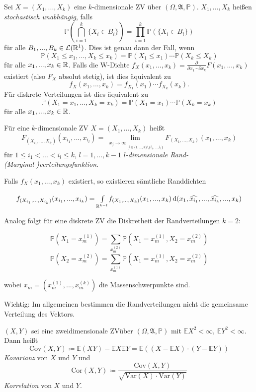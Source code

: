 \documentclass{cheat-sheet}
\newcommand{\Alg}{\mathfrak{A}} %
\renewcommand{\P}{\mathbb{P}} %
\newcommand{\E}{\mathbb{E}} %
\newcommand{\Var}{\mathrm{Var}} %
\newcommand{\cov}{\mathrm{Cov}} %
\newcommand{\cor}{\mathrm{Cor}} %
\begin{document}
\begin{defn}
  Sei $X = (X_1, ..., X_k)$ eine $k$-dimensionale ZV über $(\Omega, \Alg, \P)$. $X_1, ..., X_k$ heißen \emph{stochastisch unabhängig}, falls
  \[ \P(\bigcap_{i=1}^k \{ X_i \in B_i \}) = \prod_{i=1}^k \P(\{ X_i \in B_i \}) \]
  für alle $B_1, ..., B_k \in \mathcal{L}(\mathbb{R}^1)$. Dies ist genau dann der Fall, wenn
  \[ \P(X_1 \leq x_1, ..., X_k \leq x_k) = \P(X_1 \leq x_1) \cdots \P(X_k \leq X_k) \]
  für alle $x_1, ..., x_k \in \mathbb{R}$. Falls die W-Dichte $f_X(x_1, ..., x_k) = \tfrac{\partial}{\partial x_1 \cdots \partial x_k} F(x_1, ..., x_k)$ existiert (also $F_X$ absolut stetig), ist dies äquivalent zu
  \[ f_X(x_1, ..., x_k) = f_{X_1}(x_1) \cdots f_{X_k}(x_k). \]
  Für diskrete Verteilungen ist dies äquivalent zu
  \[ \P(X_1 = x_1, ..., X_k = x_k) = \P(X_1 = x_1) \cdots \P(X_k = x_k) \]
  für alle $x_1, ..., x_k \in \mathbb{R}$.
\end{defn}

\begin{defn}
  Für eine $k$-dimensionale ZV $X = (X_1, ..., X_k)$ heißt
  \[ F_{(X_{i_1}, ..., X_{i_l})}(x_{i_1}, ..., x_{i_l}) = \lim_{\substack{x_j \to \infty}_{j \in \{ 1, ..., k\} \setminus \{ i_1, ..., i_l \}}} F_(X_1, ..., X_k)(x_1, ..., x_k) \]
  für $1 \leq i_1 < ... < i_l \leq k$, $l = 1, ..., k-1$ \emph{$l$-dimensionale Rand-(Marginal-)verteilungsfunktion}.
\end{defn}

Falls $f_X(x_1, ..., x_k)$ existiert, so existieren sämtliche Randdichten

\[ f_{(X_{i_1}, ..., X_{i_k})}(x_{i_1}, ..., x_{i_k}) = {\textstyle \int\limits_{\mathbb{R}^{k-l}}^{}} f_{(X_1, ..., X_k)}(x_1, ..., x_k) \,\mathrm{d} (x_1, \widehat{x_{i_1}}, ..., \widehat{x_{i_k}}, ..., x_k) \]

Analog folgt für eine diskrete ZV die Diskretheit der Randverteilungen $k=2$:

\[ \P(X_1 = x_m^{(1)}) = \sum_{x_m^{(2)}} \P(X_1 = x_m^{(1)}, X_2 = x_m^{(2)}) \]
\[ \P(X_2 = x_m^{(2)}) = \sum_{x_m^{(1)}} \P(X_1 = x_m^{(1)}, X_2 = x_m^{(2)}) \]

wobei $x_m = (x_m^{(1)}, ..., x_m^{(k)})$ die Massenschwerpunkte sind.

Wichtig: Im allgemeinen bestimmen die Randverteilungen nicht die gemeinsame Verteilung des Vektors.



\begin{defn}
  $(X, Y)$ sei eine zweidimensionale ZVüber $(\Omega, \Alg, \P)$ mit $\E X^2 < \infty$, $\E Y^2 < \infty$. Dann heißt
  \[ \cov(X, Y) \coloneqq \E(XY) - \E X \E Y = \E ((X - \E X) \cdot (Y - \E Y)) \]
  \emph{Kovarianz} von $X$ und $Y$ und
  \[ \cor(X, Y) \coloneqq \frac{\cov(X, Y)}{\sqrt{\Var(X) \cdot \Var(Y)}} \]
  \emph{Korrelation} von $X$ und $Y$.
\end{defn}
\end{document}
